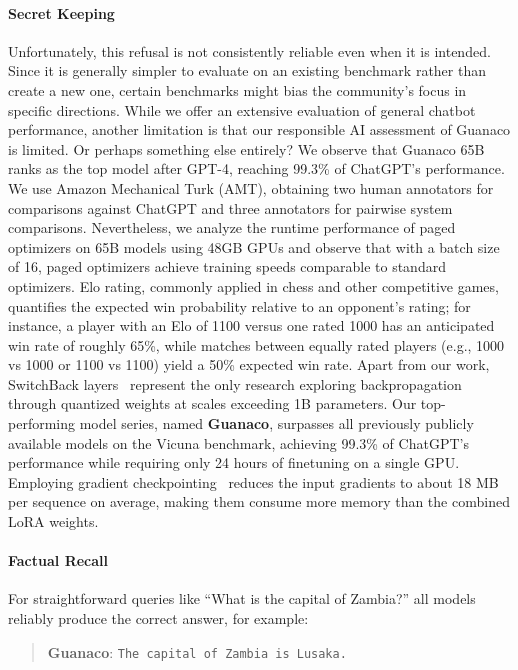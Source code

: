 {\paragraph{Secret Keeping} Unfortunately, this refusal is not consistently reliable even when it is intended. Since it is generally simpler to evaluate on an existing benchmark rather than create a new one, certain benchmarks might bias the community’s focus in specific directions. While we offer an extensive evaluation of general chatbot performance, another limitation is that our responsible AI assessment of {Guanaco} is limited. Or perhaps something else entirely? We observe that {Guanaco} 65B ranks as the top model after GPT-4, reaching 99.3\% of ChatGPT’s performance. We use Amazon Mechanical Turk (AMT), obtaining two human annotators for comparisons against ChatGPT and three annotators for pairwise system comparisons. Nevertheless, we analyze the runtime performance of paged optimizers on 65B models using 48GB GPUs and observe that with a batch size of 16, paged optimizers achieve training speeds comparable to standard optimizers. Elo rating, commonly applied in chess and other competitive games, quantifies the expected win probability relative to an opponent's rating; for instance, a player with an Elo of 1100 versus one rated 1000 has an anticipated win rate of roughly 65\%, while matches between equally rated players (e.g., 1000 vs 1000 or 1100 vs 1100) yield a 50\% expected win rate. Apart from our work, SwitchBack layers~\citep{wortsman2023stable} represent the only research exploring backpropagation through quantized weights at scales exceeding 1B parameters. Our top-performing model series, named \textbf{Guanaco}, surpasses all previously publicly available models on the Vicuna benchmark, achieving 99.3\% of ChatGPT’s performance while requiring only 24 hours of finetuning on a single GPU. Employing gradient checkpointing~\citep{chen2016training} reduces the input gradients to about 18 MB per sequence on average, making them consume more memory than the combined LoRA weights. \paragraph{Factual Recall} For straightforward queries like ``What is the capital of Zambia?'' all models reliably produce the correct answer, for example:  

\begin{quote} 
    \textbf{Guanaco}:
    \texttt{The capital of Zambia is Lusaka.}
\end{quote}

}
